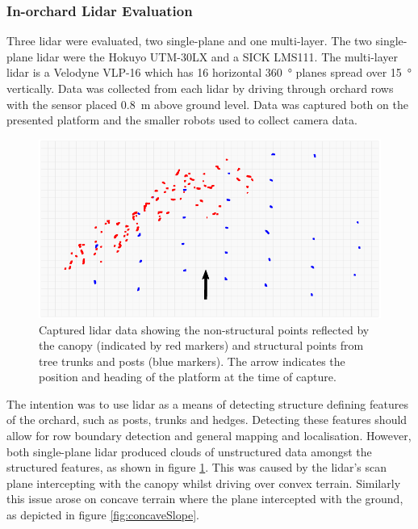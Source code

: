 \documentclass[preprint,authoryear,12pt]{elsarticle}
\begin{document}
    \subsubsection{In-orchard Lidar Evaluation}
        Three lidar were evaluated, two single-plane and one multi-layer.
        The two single-plane lidar were the Hokuyo UTM-30LX and a SICK LMS111.
        The multi-layer lidar is a Velodyne VLP-16 which has 16 horizontal \SI{360}{\degree} planes spread over \SI{15}{\degree} vertically.
        Data was collected from each lidar by driving through orchard rows with the sensor placed \SI{0.8}{\meter} above ground level.
        Data was captured both on the presented platform and the smaller robots used to collect camera data.

        \begin{figure}[htb]
            \centering
            \includegraphics[width=\linewidth]{imgs/canopy_data/canopy_data.pdf}
            \caption{
                Captured lidar data showing the non-structural points reflected by the canopy (indicated by red markers) and structural points from tree trunks and posts (blue markers).
                The arrow indicates the position and heading of the platform at the time of capture.
            }
            \label{fig:canopyDataCloud}
        \end{figure}

        The intention was to use lidar as a means of detecting structure defining features of the orchard, such as posts, trunks and hedges.
        Detecting these features should allow for row boundary detection and general mapping and localisation.
        However, both single-plane lidar produced clouds of unstructured data amongst the structured features, as shown in figure \ref{fig:canopyDataCloud}.
        This was caused by the lidar's scan plane intercepting with the canopy whilst driving over convex terrain.
        Similarly this issue arose on concave terrain where the plane intercepted with the ground, as depicted in figure \ref{fig:concaveSlope}.
\end{document}
